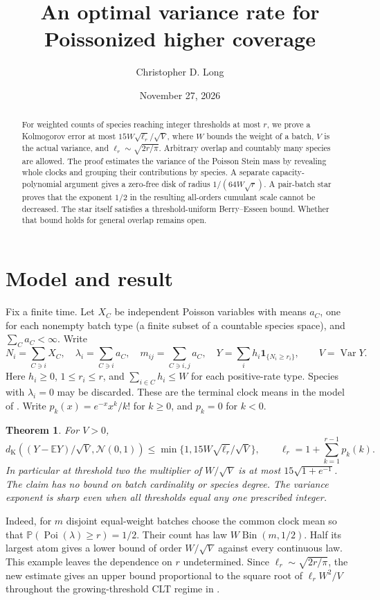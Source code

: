 \documentclass[11pt]{article}
\title{An optimal variance rate for Poissonized higher coverage}
\author{Christopher D. Long}
\date{November 27, 2026}
\newtheorem{theorem}{Theorem}[section]
\newcommand{\E}{\mathbb E}
\newcommand{\Prb}{\mathbb P}
\newcommand{\Var}{\operatorname{Var}}
\newcommand{\Poi}{\operatorname{Poi}}
\newcommand{\ind}{\mathbf1}
\newcommand{\dK}{d_{\mathrm K}}
\newcommand{\Nlaw}{\mathcal N(0,1)}
\numberwithin{equation}{section}
\begin{document}
\maketitle
\begin{abstract}
For weighted counts of species reaching integer thresholds at most $r$, we prove a
Kolmogorov error at most $15W\sqrt{\ell_r}/\sqrt V$, where $W$ bounds the weight of a
batch, $V$ is the actual variance, and $\ell_r\sim\sqrt{2r/\pi}$.
Arbitrary overlap and countably many species are allowed.
The proof estimates the variance of the Poisson Stein mass by revealing whole
clocks and grouping their contributions by species. A separate capacity-polynomial argument gives
a zero-free disk of radius $1/(64W\sqrt r)$. A pair-batch star proves that
the exponent $1/2$ in the resulting all-orders cumulant scale cannot be decreased.
The star itself satisfies a threshold-uniform Berry--Esseen bound. Whether
that bound holds for general overlap remains open.
\end{abstract}

\section{Model and result}
Fix a finite time. Let $X_C$ be independent Poisson variables with means $a_C$,
one for each nonempty batch type (a finite subset of a countable species space),
and $\sum_C a_C<\infty$. Write
\[
 N_i=\sum_{C\ni i}X_C,\quad \lambda_i=\sum_{C\ni i}a_C,\quad
 m_{ij}=\sum_{C\ni i,j}a_C,\quad
 Y=\sum_i h_i\ind_{\{N_i\ge r_i\}},\qquad V=\Var Y.
\]
Here $h_i\ge0$, $1\le r_i\le r$, and $\sum_{i\in C}h_i\le W$ for each positive-rate type.
Species with $\lambda_i=0$ may be discarded. These are the terminal clock means in the model of
\cite{Q}. Write $p_k(x)=e^{-x}x^k/k!$ for $k\ge0$, and $p_k=0$ for $k<0$.
\begin{theorem}\label{thm:main}
For $V>0$,
\[
 \dK((Y-\E Y)/\sqrt V,\Nlaw)
 \le \min\{1,15 W\sqrt{\ell_r}/\sqrt V\},\qquad
 \ell_r=1+\sum_{k=1}^{r-1}p_k(k).
\]
In particular at threshold two the multiplier of $W/\sqrt V$ is at most
$15\sqrt{1+e^{-1}}$. The claim has no bound on batch cardinality or
species degree. The variance exponent is sharp even when all thresholds equal any one prescribed integer.
\end{theorem}
Indeed, for $m$ disjoint equal-weight batches choose the common clock mean so that
$\Prb(\Poi(\lambda)\ge r)=1/2$. Their count has law $W\operatorname{Bin}(m,1/2)$.
Half its largest atom gives a lower bound of order $W/\sqrt V$ against every continuous law.
This example leaves the dependence on $r$ undetermined. Since $\ell_r\sim\sqrt{2r/\pi}$, the new
estimate gives an upper bound proportional to the square root of $\ell_rW^2/V$ throughout the
growing-threshold CLT regime in \cite[Section~8]{Q}.
\end{document}

